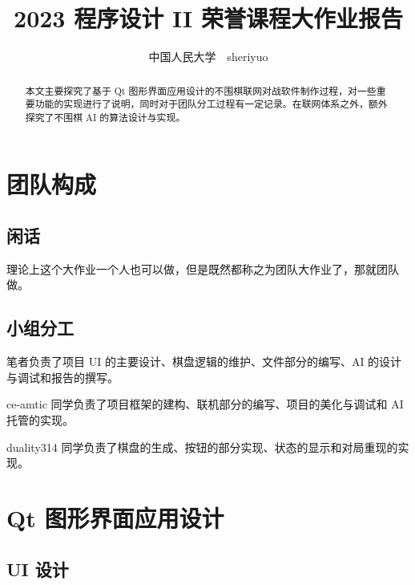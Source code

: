 \documentclass{noithesis}
\begin{document}
	
	\title{2023 程序设计 II 荣誉课程大作业报告}
	\author{中国人民大学~~sheriyuo}
	
	\maketitle
	
	\begin{abstract}
		本文主要探究了基于 Qt 图形界面应用设计的不围棋联网对战软件制作过程，对一些重要功能的实现进行了说明，同时对于团队分工过程有一定记录。在联网体系之外，额外探究了不围棋 AI 的算法设计与实现。
	\end{abstract}

	\tableofcontents
	\setcounter{page}{0}
	\thispagestyle{empty}
	\newpage
	
	\section{团队构成}
	
	\subsection{闲话}
	
	理论上这个大作业一个人也可以做，但是既然都称之为团队大作业了，那就团队做。
	
	\subsection{小组分工}
	
	笔者负责了项目 UI 的主要设计、棋盘逻辑的维护、文件部分的编写、AI 的设计与调试和报告的撰写。
	
	ce-amtic 同学负责了项目框架的建构、联机部分的编写、项目的美化与调试和 AI 托管的实现。
	
	duality314 同学负责了棋盘的生成、按钮的部分实现、状态的显示和对局重现的实现。
	
	\section{Qt 图形界面应用设计}
	
	\subsection{UI 设计}
	
\end{document}
